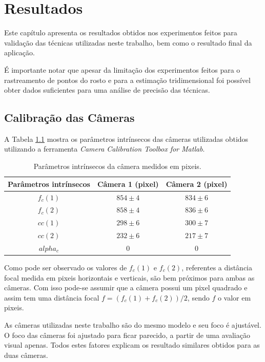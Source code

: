 \chapter{Resultados}

Este capítulo apresenta os resultados obtidos nos experimentos feitos para validação das técnicas utilizadas neste trabalho, bem como o resultado final da aplicação.

É importante notar que apesar da limitação dos experimentos feitos para o rastreamento de pontos do rosto e para a estimação tridimensional foi possível obter dados suficientes para uma análise de precisão das técnicas.

\section{Calibração das Câmeras}

A Tabela \ref{tab:params_intrisecos} mostra os parâmetros intrínsecos das câmeras utilizadas obtidos utilizando a ferramenta \textit{Camera Calibration Toolbox for Matlab}.

\begin{table}[!htb]
\centering
\begin{tabular}{|c|c|c|}
\hline
Parâmetros intrínsecos & Câmera 1 (pixel) & Câmera 2 (pixel)\\ \hline
$f_c(1)$ & $854 \pm 4$ &  $834 \pm 6$ \\ \hline
$f_c(2)$ & $858 \pm 4$ & $836 \pm 6$ \\ \hline
$cc(1)$ & $298 \pm 6$ & $300 \pm 7$ \\ \hline
$cc(2)$ & $232 \pm 6$ & $217 \pm 7$ \\ \hline
$alpha_c$ & 0 & 0 \\ \hline
\end{tabular}

\caption{Parâmetros intrínsecos da câmera medidos em pixeis.}
\label{tab:params_intrisecos}
\end{table}

Como pode ser observado os valores de $f_c(1)$ e $f_c(2)$, referentes a distância focal medida em pixeis horizontais e verticais, são bem próximos para ambas as câmeras. Com isso pode-se assumir que a câmera possui um pixel quadrado e assim tem uma distância focal $f = (f_c(1) + f_c(2))/2$, sendo $f$ o valor em pixeis.

As câmeras utilizadas neste trabalho são do mesmo modelo e seu foco é ajustável. O foco das câmeras foi ajustado para ficar parecido, a partir de uma avaliação visual apenas. Todos estes fatores explicam os resultado similares obtidos para as duas câmeras.

